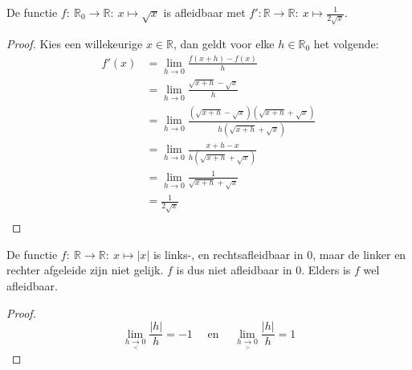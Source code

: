 \documentclass[main.tex]{subfiles}
\begin{document}
\begin{vb}
  De functie $f:\ \mathbb{R}_{0} \rightarrow \mathbb{R}:\ x \mapsto \sqrt{x}$ is afleidbaar met $f': \mathbb{R} \rightarrow \mathbb{R}:\ x \mapsto \frac{1}{2\sqrt{x}}$.

  \begin{proof}
    Kies een willekeurige $x \in \mathbb{R}$, dan geldt voor elke $h\in \mathbb{R}_{0}$ het volgende:
    \[ 
    \begin{array}{rl}
    f'(x)
    &= \lim_{h \rightarrow 0}\frac{f(x+h)-f(x)}{h}\\
    &= \lim_{h \rightarrow 0}\frac{\sqrt{x+h}-\sqrt{x}}{h}\\
    &= \lim_{h \rightarrow 0}\frac{\left(\sqrt{x+h}-\sqrt{x}\right)\left(\sqrt{x+h}+\sqrt{x}\right)}{h\left(\sqrt{x+h}+\sqrt{x}\right)}\\
    &= \lim_{h \rightarrow 0}\frac{x+h-x}{h\left(\sqrt{x+h}+\sqrt{x}\right)}\\
    &= \lim_{h \rightarrow 0}\frac{1}{\sqrt{x+h}+\sqrt{x}}\\
    &= \frac{1}{2\sqrt{x}}\\
  \end{array}
    \]
  \end{proof}
\end{vb}

\begin{tvb}
  \label{tvb:absolute-waarde-niet-afleidbaar-in-0}
  De functie $f:\ \mathbb{R} \rightarrow \mathbb{R}:\ x \mapsto |x|$ is links-, en rechtsafleidbaar in $0$, maar de linker en rechter afgeleide zijn niet gelijk. $f$ is dus niet afleidbaar in $0$.
  Elders is $f$ wel afleidbaar.
  
  \begin{proof}
    \[ \lim_{h \underset{<}{\rightarrow} 0}\frac{|h|}{h} = -1 \quad\text{ en }\quad \lim_{h \underset{>}{\rightarrow} 0}\frac{|h|}{h} = 1 \]
  \end{proof}
\end{tvb}
\end{document}
